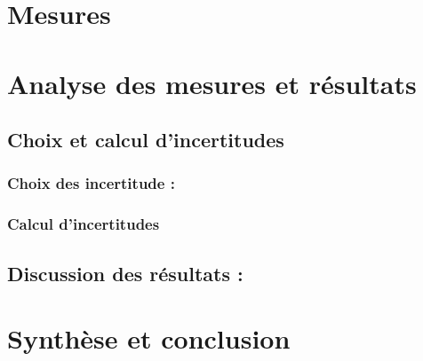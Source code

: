 \documentclass[12pt,a4paper]{article}
\begin{document}
    \section{Mesures}
    \section{Analyse des mesures et résultats}
    \subsection{Choix et calcul d'incertitudes}
    \subsubsection{Choix des incertitude :}
    \subsubsection{Calcul d'incertitudes}
    \subsection{Discussion des résultats :}
    \section{Synthèse et conclusion}
\end{document}
